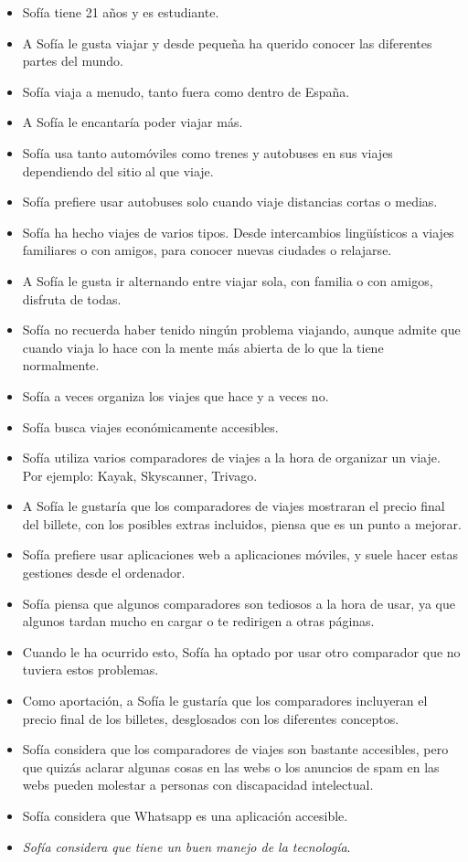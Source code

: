 \begin{itemize}
    \item Sofía tiene 21 años y es estudiante.
    \item A Sofía le gusta viajar y desde pequeña ha querido conocer las diferentes partes del mundo.
    \item Sofía viaja a menudo, tanto fuera como dentro de España.
    \item A Sofía le encantaría poder viajar más.
    \item Sofía usa tanto automóviles como trenes y autobuses en sus viajes dependiendo del sitio al que viaje.
    \item Sofía prefiere usar autobuses solo cuando viaje distancias cortas o medias.
    \item Sofía ha hecho viajes de varios tipos. Desde intercambios lingüísticos a viajes familiares o con amigos, para conocer nuevas ciudades o relajarse.
    \item A Sofía le gusta ir alternando entre viajar sola, con familia o con amigos, disfruta de todas.
    \item Sofía no recuerda haber tenido ningún problema viajando, aunque admite que cuando viaja lo hace con la mente más abierta de lo que la tiene normalmente.
    \item Sofía a veces organiza los viajes que hace y a veces no.
    \item Sofía busca viajes económicamente accesibles.
    \item Sofía utiliza varios comparadores de viajes a la hora de organizar un viaje. Por ejemplo: Kayak, Skyscanner, Trivago.
    \item A Sofía le gustaría que los comparadores de viajes mostraran el precio final del billete, con los posibles extras incluidos, piensa que es un punto a mejorar.
    \item Sofía prefiere usar aplicaciones web a aplicaciones móviles, y suele hacer estas gestiones desde el ordenador.
    \item Sofía piensa que algunos comparadores son tediosos a la hora de usar, ya que algunos tardan mucho en cargar o te redirigen a otras páginas.
    \item Cuando le ha ocurrido esto, Sofía ha optado por usar otro comparador que no tuviera estos problemas.
    \item Como aportación, a Sofía le gustaría que los comparadores incluyeran el precio final de los billetes, desglosados con los diferentes conceptos.
    \item Sofía considera que los comparadores de viajes son bastante accesibles, pero que quizás aclarar algunas cosas en las webs o los anuncios de spam en las webs pueden molestar a personas con discapacidad intelectual.
    \item Sofía considera que Whatsapp es una aplicación accesible.
    \item \textit{Sofía considera que tiene un buen manejo de la tecnología}.
\end{itemize}


